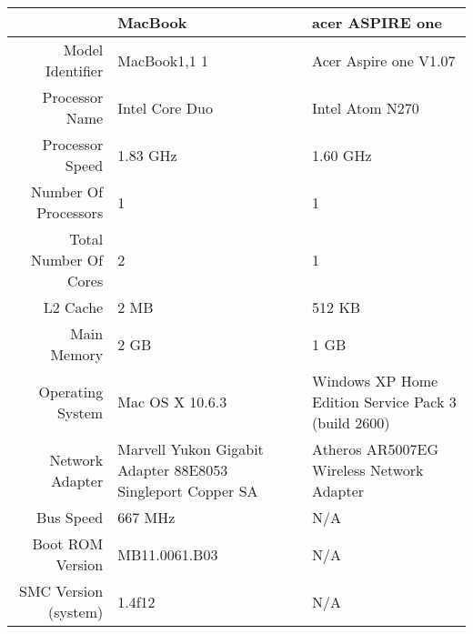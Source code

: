   \begin{table}[tbp]
    \begin{center}
    \begin{tabular}{| r | p{5cm} | p{5cm} |}
      \hline
                            & MacBook                                                    & acer ASPIRE one                                     \\ \hline         
      Model Identifier      & MacBook1,1 1                                               & Acer Aspire one V1.07                               \\ \hline
      Processor Name        & Intel Core Duo                                             & Intel Atom N270                                     \\ \hline
      Processor Speed       & 1.83 GHz                                                   & 1.60 GHz                                            \\ \hline
      Number Of Processors  & 1                                                          & 1                                                   \\ \hline
      Total Number Of Cores & 2                                                          & 1                                                   \\ \hline
      L2 Cache              & 2 MB                                                       & 512 KB                                              \\ \hline
      Main Memory           & 2 GB                                                       & 1 GB                                                \\ \hline
      Operating System      & Mac OS X 10.6.3                                            & Windows XP Home Edition Service Pack 3 (build 2600) \\ \hline
      Network  Adapter      & Marvell Yukon Gigabit Adapter 88E8053 Singleport Copper SA & Atheros AR5007EG Wireless Network Adapter           \\ \hline
      Bus Speed             & 667 MHz                                                    & N/A                                                 \\ \hline
      Boot ROM Version      & MB11.0061.B03                                              & N/A                                                 \\ \hline
      SMC Version (system)  & 1.4f12                                                     & N/A                                                 \\ \hline

\end{tabular}
\end{center}
\end{table}
